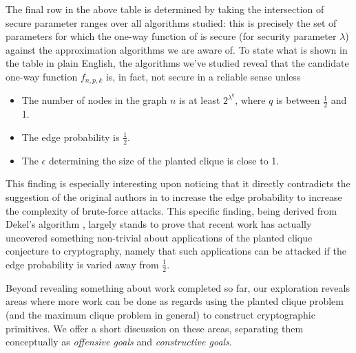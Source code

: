 \documentclass{article}
\theoremstyle{definition}
\begin{document}
The final row in the above table is determined by taking the intersection of secure parameter 
ranges over all algorithms studied: this is precisely the set of parameters for which 
the one-way function of \cite{HidingCliques} is secure (for security parameter $\lambda$) against 
the approximation algorithms we are aware of.  To state what is shown in the table in 
plain English, the algorithms we've studied reveal that the candidate one-way function 
$f_{n,p,k}$ is, in fact, not secure in a reliable sense unless

\begin{itemize}
\item{The number of nodes in the graph $n$ is at least $2^{\lambda^q}$, where $q$ is 
between $\frac{1}{2}$ and 1.}
\item{The edge probability is $\frac{1}{2}$.}
\item{The $\epsilon$ determining the size of the planted clique is close to 1.}
\end{itemize}

\noindent This finding is especially interesting upon noticing that it directly contradicts 
the suggestion of the original authors in \cite{HidingCliques} to increase the edge 
probability to increase the complexity of brute-force attacks.  This specific finding, 
being derived from Dekel's algorithm \cite{Combinatoric}, largely stands to prove that recent work has 
actually uncovered something non-trivial about applications of the planted clique conjecture 
to cryptography, namely that such applications can be attacked if the edge probability is 
varied away from $\frac{1}{2}$.

Beyond revealing something about work completed so far, our exploration reveals areas 
where more work can be done as regards using the planted clique problem (and the 
maximum clique problem in general) to construct cryptographic primitives.  We offer a short 
discussion on these areas, separating them conceptually as \textit{offensive goals} and 
\textit{constructive goals}.
\end{document}
